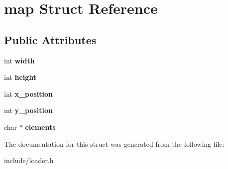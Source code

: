 \hypertarget{structmap}{\section{map Struct Reference}
\label{structmap}
}
\subsection*{Public Attributes}
\begin{DoxyCompactItemize}
\item 
\hypertarget{structmap_a34b43c4ecce8de3a5228b7f4e6d66740}{int {\bfseries width}}\label{structmap_a34b43c4ecce8de3a5228b7f4e6d66740}

\item 
\hypertarget{structmap_a9958bc4a129d86b6e0b1b61a6ae16c41}{int {\bfseries height}}\label{structmap_a9958bc4a129d86b6e0b1b61a6ae16c41}

\item 
\hypertarget{structmap_a4b19a8edb04d1111776bc3629cc7ca1f}{int {\bfseries x\-\_\-position}}\label{structmap_a4b19a8edb04d1111776bc3629cc7ca1f}

\item 
\hypertarget{structmap_a41ea6d64c3b137ae6e0c2737ff84b643}{int {\bfseries y\-\_\-position}}\label{structmap_a41ea6d64c3b137ae6e0c2737ff84b643}

\item 
\hypertarget{structmap_aff6e04be34e9c58d36d9b44f86bd48dc}{char $\ast$ {\bfseries elements}}\label{structmap_aff6e04be34e9c58d36d9b44f86bd48dc}

\end{DoxyCompactItemize}


The documentation for this struct was generated from the following file\-:\begin{DoxyCompactItemize}
\item 
include/loader.\-h\end{DoxyCompactItemize}
